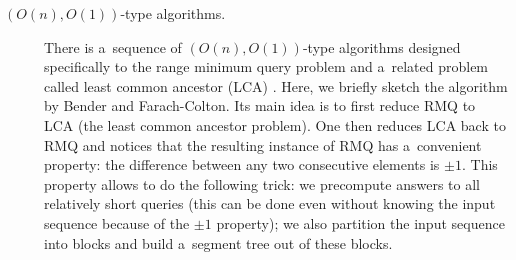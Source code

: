 \begin{description}
\item[$(O(n), O(1))$-type algorithms.]
There is a~sequence of $(O(n), O(1))$-type algorithms designed specifically to the range minimum query problem and a~related problem called least common ancestor (LCA) \cite{DBLP:journals/siamcomp/BerkmanV93,
DBLP:journals/jal/BenderFPSS05,
DBLP:conf/latin/BenderF00, 
DBLP:conf/cpm/FischerH06}. Here, we briefly sketch the algorithm by Bender and Farach-Colton. 
Its main idea is to first reduce RMQ to LCA (the least common ancestor problem). One then reduces LCA back to RMQ and notices that the resulting instance of RMQ has a~convenient property: the difference between any two consecutive elements is $\pm 1$. This property allows to do the following trick: we precompute answers to all relatively short queries (this can be done even without knowing the input sequence because of the $\pm 1$ property); we also partition the input sequence into blocks and build a~segment tree out of these blocks.
\end{description}

